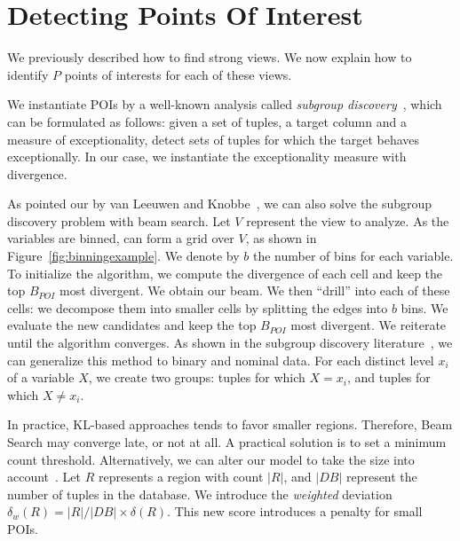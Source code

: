 \section{Detecting Points Of Interest}
\label{sec:detec}

We previously described how to find strong views. We now
explain how to identify $P$ points of interests for each of these views. 

We instantiate POIs by a well-known analysis called
\emph{subgroup discovery}~\cite{klosgen1996explora, wrobel1997algorithm}, which
can be formulated as follows: given a set of tuples, a target column and a
measure of exceptionality, detect sets of tuples for which the target behaves
exceptionally. In our case, we instantiate the exceptionality measure
with divergence. 

As pointed our by van Leeuwen and Knobbe~\cite{van2011non}, we can also solve
the subgroup discovery problem with beam search.  Let $V$ represent the view to
analyze. As the variables are binned, can form a grid over $V$, as shown in
Figure~\ref{fig:binningexample}. We denote by $b$ the number of bins for each
variable. To initialize the algorithm, we compute the divergence of each cell
and keep the top $B_{POI}$ most divergent. We obtain our beam. We then
``drill'' into each of these cells: we decompose them into smaller cells by
splitting the edges into $b$ bins. We evaluate the new candidates and keep the
top $B_{POI}$ most divergent. We reiterate until the algorithm converges. As
shown in the subgroup discovery literature~\cite{wrobel1997algorithm,
van2011non}, we can generalize this method to binary and nominal data. For each
distinct level $x_i$ of a variable $X$, we create two groups: tuples for which
$X = x_i$, and tuples for which $X \neq x_i$.

In practice, KL-based approaches tends to favor smaller regions. Therefore,
Beam Search may converge late, or not at all. A practical solution is to set a
minimum count threshold. Alternatively, we can alter our model to take the size
into account~\cite{van2011non}. Let $R$ represents a region with count $|R|$,
and $|DB|$ represent the number of tuples in the database. We introduce the
\emph{weighted} deviation $\delta_w(R) = |R|/|DB| \times \delta(R)$. This new
score introduces a penalty for small POIs.







